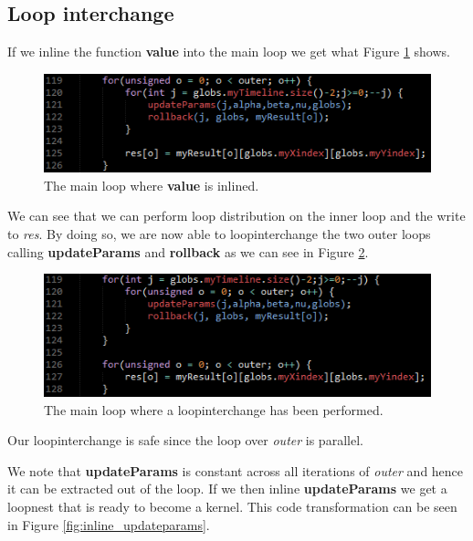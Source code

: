\subsection{Loop interchange}
If we inline the function \textbf{value} into the main loop we get what Figure
\ref{fig:inline_value} shows.

\begin{figure}[!ht]
	\centering
		\includegraphics[scale=0.8]{input/figures/inline_value.png}
		\caption{The main loop where \textbf{value} is inlined.\label{fig:inline_value}}
\end{figure}

We can see that we can perform loop distribution on the inner loop and the
write to \emph{res}. By doing so, we are now able to loopinterchange the two
outer loops calling \textbf{updateParams} and \textbf{rollback} as we can see in
Figure \ref{fig:main_loopinterchange}.

\begin{figure}[!ht]
	\centering
		\includegraphics[scale=0.8]{input/figures/main_loopinterchange.png}
		\caption{The main loop where a loopinterchange has been performed.\label{fig:main_loopinterchange}}
\end{figure}

Our loopinterchange is safe since the loop over \emph{outer} is parallel.

We note that \textbf{updateParams} is constant across all iterations of
\emph{outer} and hence it can be extracted out of the loop. If we then inline
\textbf{updateParams} we get a loopnest that is ready to become a kernel.
This code transformation can be seen in Figure \ref{fig:inline_updateparams}.

